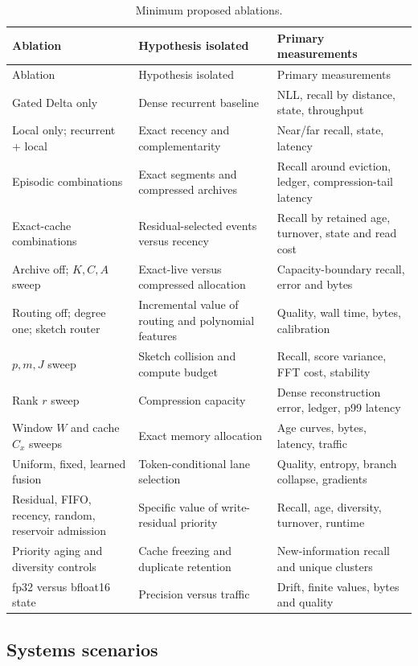 \begin{longtable}{@{}p{}p{}
  p{}@{}}
\caption{Minimum proposed ablations.}
\label{tab:ablations}\\
\toprule
Ablation & Hypothesis isolated & Primary measurements \\
\midrule
\endfirsthead
\toprule
Ablation & Hypothesis isolated & Primary measurements \\
\midrule
\endhead
Gated Delta only &
Dense recurrent baseline &
NLL, recall by distance, state, throughput \\
Local only; recurrent + local &
Exact recency and complementarity &
Near/far recall, state, latency \\
Episodic combinations &
Exact segments and compressed archives &
Recall around eviction, ledger, compression-tail latency \\
Exact-cache combinations &
Residual-selected events versus recency &
Recall by retained age, turnover, state and read cost \\
Archive off; \(K,C,A\) sweep &
Exact-live versus compressed allocation &
Capacity-boundary recall, error and bytes \\
Routing off; degree one; sketch router &
Incremental value of routing and polynomial features &
Quality, wall time, bytes, calibration \\
\(p,m,J\) sweep &
Sketch collision and compute budget &
Recall, score variance, FFT cost, stability \\
Rank \(r\) sweep &
Compression capacity &
Dense reconstruction error, ledger, p99 latency \\
Window \(W\) and cache \(C_x\) sweeps &
Exact memory allocation &
Age curves, bytes, latency, traffic \\
Uniform, fixed, learned fusion &
Token-conditional lane selection &
Quality, entropy, branch collapse, gradients \\
Residual, FIFO, recency, random, reservoir admission &
Specific value of write-residual priority &
Recall, age, diversity, turnover, runtime \\
Priority aging and diversity controls &
Cache freezing and duplicate retention &
New-information recall and unique clusters \\
fp32 versus bfloat16 state &
Precision versus traffic &
Drift, finite values, bytes and quality \\
\bottomrule
\end{longtable}

\subsection{Systems scenarios}
\label{sec:systems-evaluation}

